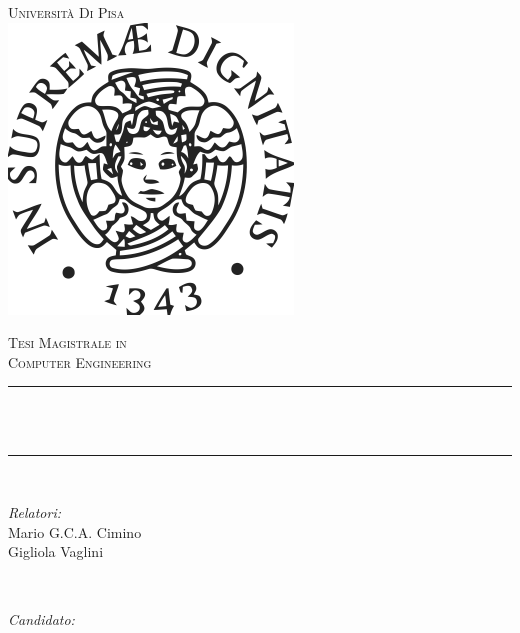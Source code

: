 \makeatletter
{}

\begin{titlepage}
    \newcommand{\HRule}{\rule{\linewidth}{0.5mm}}
    
    \center 
    \textsc{\LARGE Università Di Pisa }\\[0.3cm]

    \vspace{1cm}
    \includegraphics[scale=0.5]{img/logo.png}
    \vspace{1cm}
  
    \textsc{\Large Tesi Magistrale in }\\[0.5cm]
    \textsc{\Large Computer Engineering }\\[1.5cm]
  
    \HRule \\[0.4cm]
    { \huge \bfseries \@title }\\[0.03cm] 
    \HRule \\[1.5cm]
    
    \begin{minipage}{0.4\textwidth}
    \begin{flushleft} \large
    \emph{Relatori:}\\
    Mario G.C.A. Cimino\\
    Gigliola Vaglini
    \end{flushleft}
    \end{minipage}
    ~
    \begin{minipage}{0.4\textwidth}
    \begin{flushright} \large
    \emph{Candidato:} \\
    \@author \\ 
    \vspace{1.2\baselineskip}
    \end{flushright}
    \end{minipage}\\[1cm]
    
    \vfill

    {\large \@date }\\[1cm]

   
\end{titlepage}

\restoregeometry
